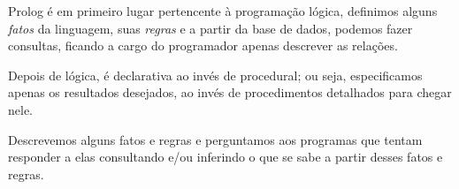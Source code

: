 
Prolog é em primeiro lugar pertencente à programação lógica, definimos alguns
\emph{fatos} da linguagem, suas \emph{regras} e a partir da base de dados,
podemos fazer consultas, ficando a cargo do programador apenas descrever as
relações.

Depois de lógica, é declarativa ao invés de procedural; ou seja, especificamos
apenas os resultados desejados, ao invés de procedimentos detalhados para chegar
nele.

Descrevemos alguns fatos e regras e perguntamos aos programas que tentam
responder a elas consultando e/ou inferindo o que se sabe a partir desses fatos
e regras.